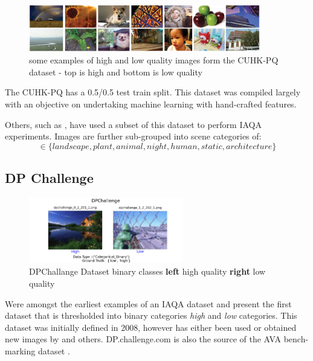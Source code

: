 \begin{figure}[hp]
\centering
\includegraphics[width=0.9\textwidth]{figures/database_ims/CUHK-PQ_c.png}
  \caption{\label{fig:Data_CUHK} some examples of high and low quality images form the CUHK-PQ dataset - top is high and bottom is low quality}
  \label{fig:Data_CUHK_}
\end{figure}

The CUHK-PQ has a 0.5/0.5 test train split.  This dataset was compiled largely with an objective on undertaking machine learning with hand-crafted features. 

Others, such as \cite{Lo2013,Cui2019}, have used a subset of this dataset to perform IAQA experiments. Images are further sub-grouped into scene categories of: 
$$\in \{landscape, plant, animal, night, human, static, architecture \} $$

\subsection{DP Challenge}

\begin{figure}[hp]
\centering
 \includegraphics[width=0.6\textwidth]{figures/database_ims/DPChallenge.png}
  \caption{\label{fig:dpchall} DPChallange Dataset binary classes \textbf{left} high quality \textbf{right} low quality}
  \label{fig:dpchall}
\end{figure}


Were amongst the earliest examples of an IAQA dataset\cite{Yang2019} and present the first dataset that is thresholded into binary categories \textit{high} and \textit{low} categories\cite{Datta2008}. This dataset was initially defined in 2008, however has either been used or obtained new images by \cite{Jin2019,Dhar2011,Wu2011,Lou2008,Aydin2015,Gadde2011,Ke2006,Gao2015a,Nishiyama2011} and others. DP.challenge.com is also the source of the AVA bench-marking dataset \cite{Murray2012}.

